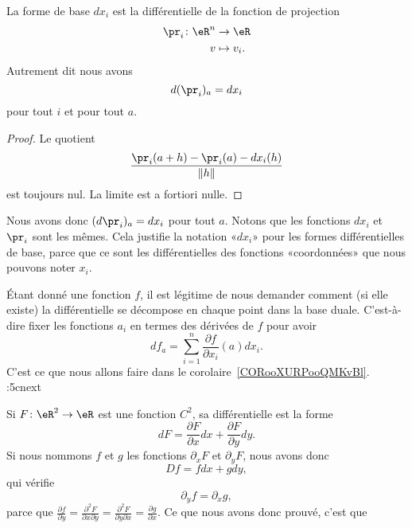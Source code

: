 \begin{proposition}
    La forme de base \( dx_i\) est la différentielle de la fonction de projection
    \begin{equation}
        \begin{aligned}
            \pr_i\colon \eR^n&\to \eR \\
            v&\mapsto v_i.
        \end{aligned}
    \end{equation}
    Autrement dit nous avons
    \begin{equation}
        d(\pr_i)_a=dx_i
    \end{equation}
    pour tout \( i\) et pour tout \( a\).
\end{proposition}

\begin{proof}
    Le quotient
    \begin{equation}
        \frac{ \pr_i(a+h)-\pr_i(a)-dx_i(h) }{ \| h \| }
    \end{equation}
    est toujours nul. La limite est a fortiori nulle.
\end{proof}

Nous avons donc \( (d\pr_i)_a=dx_i\) pour tout \( a\). Notons que les fonctions \( dx_i\) et \( \pr_i\) sont les mêmes. Cela justifie la notation «\( dx_i\)» pour les formes différentielles de base, parce que ce sont les différentielles des fonctions «coordonnées» que nous pouvons noter \( x_i\).

Étant donné une fonction \( f\), il est légitime de nous demander comment (si elle existe) la différentielle se décompose en chaque point dans la base duale. C'est-à-dire fixer les fonctions \( a_i\) en termes des dérivées de \( f\) pour avoir
\begin{equation}
    df_a=\sum_{i=1}^n\frac{ \partial f }{ \partial x_i }(a)dx_i.
\end{equation}
C'est ce que nous allons faire dans le corolaire~\ref{CORooXURPooQMKvBl}.
:5cnext

\begin{example}
    Si $F\colon \eR^2\to \eR$ est une fonction $C^2$, sa différentielle est la forme
    \begin{equation}
        dF=\frac{ \partial F }{ \partial x }dx+\frac{ \partial F }{ \partial y }dy.
    \end{equation}
    Si nous nommons $f$ et $g$ les fonctions $\partial_xF$ et $\partial_yF$, nous avons donc
    \begin{equation}
        Df=fdx+gdy,
    \end{equation}
    qui vérifie
    \begin{equation}
        \partial_yf=\partial_xg,
    \end{equation}
    parce que $\frac{ \partial f }{ \partial y }=\frac{ \partial^2F  }{ \partial x\partial y }=\frac{ \partial^2F  }{ \partial y\partial x }=\frac{ \partial g }{ \partial x }$. Ce que nous avons donc prouvé, c'est que
\end{example}

